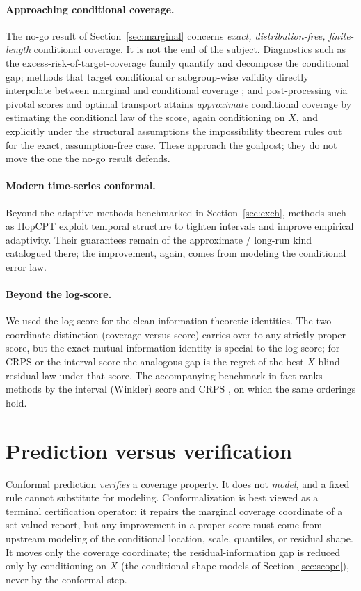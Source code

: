 \documentclass[11pt]{article}
\theoremstyle{definition}
\begin{document}
\paragraph{Approaching conditional coverage.}
The no-go result of Section~\ref{sec:marginal} concerns \emph{exact, distribution-free,
finite-length} conditional coverage. It is not the end of the subject. Diagnostics such as
the excess-risk-of-target-coverage family \citep{braun2025conditional} quantify and
decompose the conditional gap; methods that target conditional or subgroup-wise validity
directly interpolate between marginal and conditional coverage \citep{gibbs2025conditional};
and post-processing via pivotal scores and optimal transport
\citep{laplante2026pivotal} attains \emph{approximate} conditional coverage by estimating
the conditional law of the score, again conditioning on $X$, and explicitly under the
structural assumptions the impossibility theorem rules out for the exact, assumption-free
case. These approach the goalpost; they do not move the one the no-go result defends.

\paragraph{Modern time-series conformal.}
Beyond the adaptive methods benchmarked in Section~\ref{sec:exch}, methods such as HopCPT
\citep{auer2023hopcpt} exploit temporal structure to tighten intervals and improve
empirical adaptivity. Their guarantees remain of the approximate / long-run kind catalogued
there; the improvement, again, comes from modeling the conditional error law.

\paragraph{Beyond the log-score.}
We used the log-score for the clean information-theoretic identities. The two-coordinate
distinction (coverage versus score) carries over to any strictly proper score, but the exact
mutual-information identity is special to the log-score; for CRPS or the interval score the
analogous gap is the regret of the best $X$-blind residual law under that score. The
accompanying benchmark in fact ranks methods by the interval (Winkler) score and CRPS
\citep{gneiting2007strictly}, on which the same orderings hold.

\section{Prediction versus verification}\label{sec:verification}
Conformal prediction \emph{verifies} a coverage property. It does not \emph{model}, and a
fixed rule cannot substitute for modeling. Conformalization is best viewed as a terminal
certification operator: it repairs the marginal coverage coordinate of a set-valued report,
but any improvement in a proper score must come from upstream modeling of the conditional
location, scale, quantiles, or residual shape. It moves only the coverage coordinate; the
residual-information gap is reduced only by conditioning on $X$ (the conditional-shape models
of Section~\ref{sec:scope}), never by the conformal step.
\end{document}
